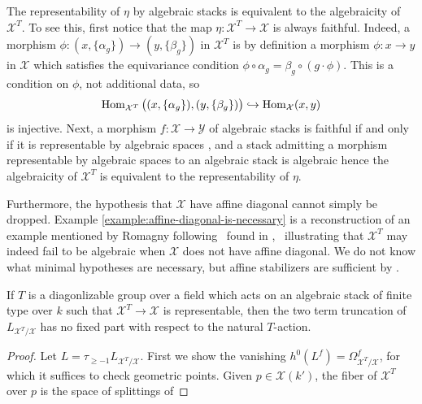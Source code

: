 \documentclass[12pt,dvipsnames]{amsart}
\begin{document}
\begin{remark}\label{rl-000E}\label{rmk:algebraicity-is-representability}
  The representability of \(\eta\) by algebraic stacks is equivalent to the algebraicity of \(\mathcal X^T\). To see this, first notice that the map \(\eta:\mathcal X^T\to \mathcal X\) is always faithful. Indeed, a morphism \(\phi:(x,\{\alpha_g\})\to (y,\{\beta_g\})\) in \(\mathcal X^T\) is by definition a morphism \(\phi:x\to y\) in \(\mathcal X\) which satisfies the equivariance condition \(\phi\circ \alpha_g = \beta_g \circ (g\cdot \phi)\). This is a condition on \(\phi\), not additional data, so
  \[\operatorname{Hom}_{\mathcal X^T}\big((x,\{\alpha_g\}), (y,\{\beta_g\})\big) \hookrightarrow \operatorname{Hom}_{\mathcal X}(x,y)\]
  is injective. Next, a morphism \(f:\mathcal X\to \mathcal Y\) of algebraic stacks is faithful if and only if it is representable by algebraic spaces \cite[\href{https://stacks.math.columbia.edu/tag/04Y5}{Tag 04Y5}]{stacks-project}, and a stack admitting a morphism representable by algebraic spaces to an algebraic stack is algebraic \cite[\href{https://stacks.math.columbia.edu/tag/03YS}{Tag 03YS}]{stacks-project} hence the algebraicity of \(\mathcal X^T\) is equivalent to the representability of \(\eta\).
\end{remark}
Furthermore, the hypothesis that \(\mathcal X\) have affine diagonal cannot simply be dropped. Example \ref{example:affine-diagonal-is-necessary} is a reconstruction of an example mentioned by Romagny following~\cite[Theorem 1.2.2]{romagny_AlgebraicitySmoothnessFixed2022} found in \cite[Exp. IX, Rem. 7.4]{SGA3-2},~ illustrating that \(\mathcal X^T\) may indeed fail to be algebraic when \(\mathcal X\) does not have affine diagonal. We do not know what minimal hypotheses are necessary, but affine stabilizers are sufficient by \cite[Theorem A.20]{aranha-khan-latyntsev-etal_VirtualLocalizationRevisited2025}.
\begin{lemma}\label{rl-000F}\label{lem:two-term-truncation-of-fixed-locus-cotangent-complex-no-fixed-part}
  If \(T\) is a diagonlizable group over a field which acts on an algebraic stack of finite type over \(k\) such that \(\mathcal X^T\to \mathcal X\) is representable, then the two term truncation of \(L_{\mathcal X^T/\mathcal X}\) has no fixed part with respect to the natural \(T\)-action.
\end{lemma}
\begin{proof}
  Let \(L = \tau_{\geq -1}L_{\mathcal X^T/\mathcal X}\). First we show the vanishing \(h^0(L^f) = \Omega^f_{\mathcal X^T/\mathcal X}\), for which it suffices to check geometric points. Given \(p\in \mathcal X(k')\), the fiber of \(\mathcal X^T\) over \(p\) is the space of splittings of 
\end{proof}
\end{document}
